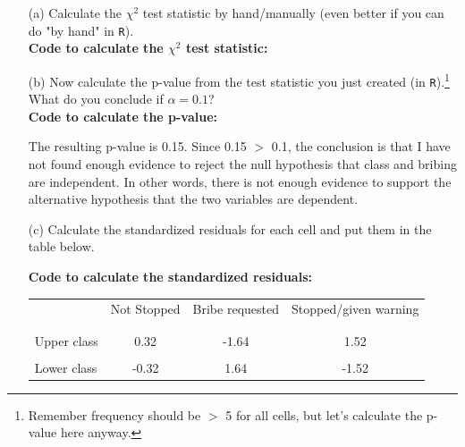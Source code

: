 \documentclass[12pt,letterpaper]{article}
\begin{document}
\begin{enumerate}
	
	\item [(a)]
	Calculate the $\chi^2$ test statistic by hand/manually (even better if you can do "by hand" in \texttt{R}).\\
	
	\noindent \textbf {Code to calculate the  $\chi^2$ test statistic:}
	
	\newpage
	
	
	\item [(b)]
	Now calculate the p-value from the test statistic you just created (in \texttt{R}).\footnote{Remember frequency should be $>$ 5 for all cells, but let's calculate the p-value here anyway.}  What do you conclude if $\alpha = 0.1$?\\
	
	\noindent \textbf {Code to calculate the  p-value:}
	
	
	The resulting p-value is 0.15. Since 0.15 $>$ 0.1, the conclusion is that I have not found enough evidence to reject the null hypothesis that class and bribing are independent. 
	In other words, there is not enough evidence to support the alternative hypothesis that the two variables are dependent. 
	
	\newpage
	\item [(c)] Calculate the standardized residuals for each cell and put them in the table below.
	\vspace{.5cm}
	
	\noindent \textbf {Code to calculate the standardized residuals:}
	
	
	\begin{table}[h]
		\centering
		\begin{tabular}{l | c c c }
			& Not Stopped & Bribe requested & Stopped/given warning \\
			\\[-1.8ex] 
			\hline \\[-1.8ex]
			Upper class  & 0.32 & -1.64 & 1.52 \\
			\\
			Lower class & -0.32 & 1.64 & -1.52 \\
			
		\end{tabular}
	\end{table}
	

\end{enumerate}
\end{document}
